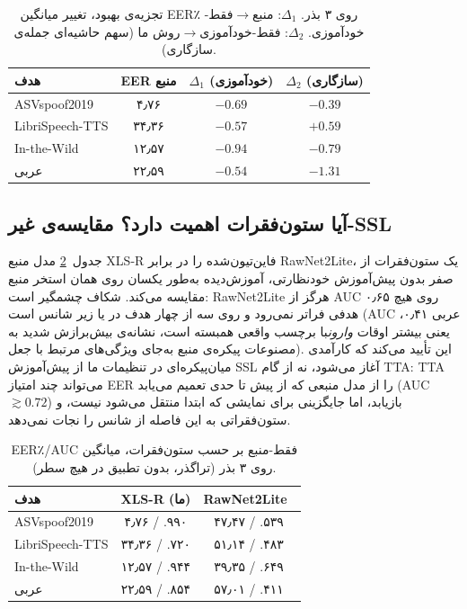 \documentclass[a4paper,11pt]{article}
\begin{document}
\begin{table}[t]
\centering
\caption{تجزیه‌ی بهبود، تغییر میانگین EER٪ روی ۳ بذر. $\Delta_1$:
منبع$\to$فقط-خودآموزی. $\Delta_2$: فقط-خودآموزی$\to$روش ما (سهم حاشیه‌ای
جمله‌ی سازگاری).}
\label{tab:gaindecomp}
\begin{tabular}{@{}lccc@{}}
\toprule
هدف & EER منبع & $\Delta_1$ (خودآموزی) & $\Delta_2$ (سازگاری) \\
\midrule
ASVspoof2019 & ۴٫۷۶ & $-0.69$ & $-0.39$ \\
LibriSpeech-TTS & ۳۴٫۳۶ & $-0.57$ & \cellcolor{red!10}$+0.59$ \\
In-the-Wild & ۱۲٫۵۷ & $-0.94$ & $-0.79$ \\
عربی & ۲۲٫۵۹ & $-0.54$ & $-1.31$ \\
\bottomrule
\end{tabular}
\end{table}

\subsection{آیا ستون‌فقرات اهمیت دارد؟ مقایسه‌ی غیر-SSL}
\label{sec:backbone}
جدول~\ref{tab:backbone} مدل منبع XLS-R فاین‌تیون‌شده را در برابر
RawNet2Lite، یک ستون‌فقرات از صفر بدون پیش‌آموزش خودنظارتی، آموزش‌دیده به‌طور
یکسان روی همان استخر منبع مقایسه می‌کند. شکاف چشمگیر است: RawNet2Lite هرگز
از AUC ۰٫۶۵ روی هیچ هدفی فراتر نمی‌رود و روی سه از چهار هدف در یا زیر شانس
است (AUC عربی ۰٫۴۱، یعنی بیشتر اوقات \emph{وارون}با برچسب واقعی همبسته
است، نشانه‌ی بیش‌برازش شدید به مصنوعات پیکره‌ی منبع به‌جای ویژگی‌های
مرتبط با جعل). این تأیید می‌کند که کارآمدی میان‌پیکره‌ای در تنظیمات ما از
پیش‌آموزش SSL آغاز می‌شود، نه از گام TTA: TTA می‌تواند چند امتیاز EER را از
مدل منبعی که از پیش تا حدی تعمیم می‌یابد (AUC $\gtrsim\!0.72$) بازیابد،
اما جایگزینی برای نمایشی که ابتدا منتقل می‌شود نیست، و ستون‌فقراتی به این
فاصله از شانس را نجات نمی‌دهد.

\begin{table}[t]
\centering
\caption{EER٪/AUC فقط-منبع بر حسب ستون‌فقرات، میانگین روی ۳ بذر (تراگذر،
بدون تطبیق در هیچ سطر).}
\label{tab:backbone}
\begin{tabular}{@{}lcc@{}}
\toprule
هدف & XLS-R (ما) & RawNet2Lite~\cite{rawnet2} \\
\midrule
ASVspoof2019 & ۴٫۷۶ / .۹۹۰ & ۴۷٫۴۷ / .۵۳۹ \\
LibriSpeech-TTS & ۳۴٫۳۶ / .۷۲۰ & ۵۱٫۱۴ / .۴۸۳ \\
In-the-Wild & ۱۲٫۵۷ / .۹۴۴ & ۳۹٫۳۵ / .۶۴۹ \\
عربی & ۲۲٫۵۹ / .۸۵۴ & ۵۷٫۰۱ / .۴۱۱ \\
\bottomrule
\end{tabular}
\end{table}
\end{document}
